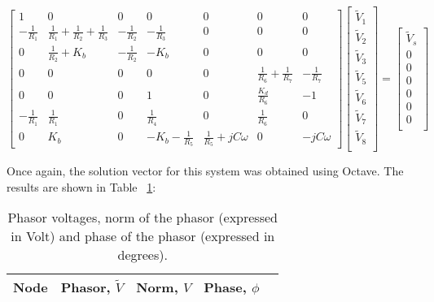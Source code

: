 \[
{\begin{bmatrix}
1 & 0 & 0 & 0 & 0 & 0 & 0\\
-\frac{1}{R_1} & \frac{1}{R_1}+\frac{1}{R_2}+\frac{1}{R_3} & -\frac{1}{R_2} & -\frac{1}{R_3} & 0 & 0 & 0\\
0 & \frac{1}{R_2}+K_b & -\frac{1}{R_2} & -K_b & 0 & 0 & 0\\
0 & 0 & 0 & 0 & 0 & \frac{1}{R_6}+\frac{1}{R_7} & -\frac{1}{R_7}\\
0 & 0 & 0 & 1 & 0 & \frac{K_d}{R_6} & -1\\
-\frac{1}{R_1} & \frac{1}{R_1} & 0 & \frac{1}{R_4} & 0 & \frac{1}{R_6} & 0\\
0 & K_b & 0 & -K_b-\frac{1}{R_5} & \frac{1}{R_5}+jC\omega & 0 & -jC\omega
            \end{bmatrix}
            }
{\begin{bmatrix}
\widetilde{V}_1\\
\widetilde{V}_2\\
\widetilde{V}_3\\
\widetilde{V}_5\\
\widetilde{V}_6\\
\widetilde{V}_7\\
\widetilde{V}_8\\
            \end{bmatrix}
            }
    =
{\begin{bmatrix}
\widetilde{V}_s\\
0\\
0\\
0\\
0\\
0\\
0\\
            \end{bmatrix}
            }
\]

Once again, the solution vector for this system was obtained using Octave. The results are shown in Table ~\ref{tab:phasortab}:

\begin{table}[H]
  \centering
  \begin{tabular}{|c|c|c|c|c}
    \hline    
    {\bf Node} & {\bf Phasor, $\widetilde{V}$} & {\bf Norm, $V$} & {\bf Phase, $\phi$} \\ \hline
    
  \end{tabular}
  \caption{Phasor voltages, norm of the phasor (expressed in Volt) and phase of the phasor (expressed in degrees).}
  \label{tab:phasortab}
\end{table}

